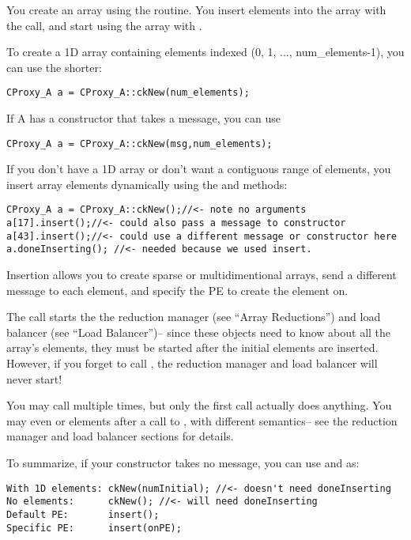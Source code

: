 You create an array using the 
routine.  You insert elements into the array with the
 call, and start using
the array with .

To create a 1D array containing elements indexed 
(0, 1, ..., num\_elements-1), you can use the shorter:

\begin{verbatim}
CProxy_A a = CProxy_A::ckNew(num_elements);
\end{verbatim}

If A has a constructor that takes a message, you can use

\begin{verbatim}
CProxy_A a = CProxy_A::ckNew(msg,num_elements);
\end{verbatim}


If you don't have a 1D array or don't want a contiguous range
of elements, you insert array elements dynamically using the 
 and  methods:
\begin{verbatim}
CProxy_A a = CProxy_A::ckNew();//<- note no arguments
a[17].insert();//<- could also pass a message to constructor
a[43].insert();//<- could use a different message or constructor here
a.doneInserting(); //<- needed because we used insert.
\end{verbatim}

Insertion allows you to create sparse or multidimentional arrays,
send a different message to each element, and specify the PE to create 
the element on.  

The  call starts the the reduction manager (see ``Array
Reductions'') and load balancer (see ``Load Balancer'')-- since
these objects need to know about all the array's elements, they
must be started after the initial elements are inserted.
However, if you forget to call , the reduction manager 
and load balancer will never start!

You may call  multiple times, but only the first
call actually does anything.  You may even  or 
elements after a call to , with different semantics-- 
see the reduction manager and load balancer sections for details.


To summarize, if your constructor takes no message, you can use  and  as:
\begin{verbatim}
With 1D elements: ckNew(numInitial); //<- doesn't need doneInserting
No elements:      ckNew(); //<- will need doneInserting
Default PE:       insert();
Specific PE:      insert(onPE);
\end{verbatim}

